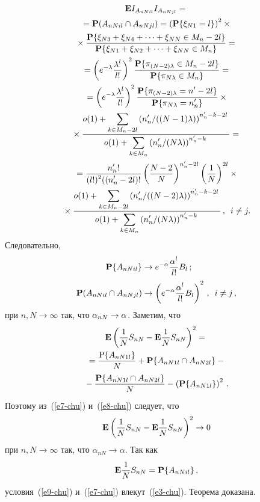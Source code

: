 \begin{multicols}{2}
\noindent
\begin{multline*}
\mathbf{E} I_{A_{nNil}}I_{A_{nNjl}}={}\\[1pt]
{}=\mathbf{P}(A_{nNil}\cap A_{nNjl}) =
\left(\mathbf{P}\{\xi_{N1}=l\}\right)^2\times{}\\[1pt]
{}\times \displaystyle\frac{\displaystyle \mathbf{P}\{
 \xi_{N3}+\xi_{N4}+ \dots +\xi_{NN}\in M_n-2l\}\mathstrut}{\displaystyle \mathbf{P}\{
 \xi_{N1}+\xi_{N2}+ \dots +\xi_{NN}\in M_n\}\mathstrut}={}\\[1pt]
{}=
\left(e^{-\lambda}\displaystyle\frac{\displaystyle \lambda^l\mathstrut}{\displaystyle l!\mathstrut}\right)^2\displaystyle\frac{\displaystyle \mathbf{P}\{
\pi_{(N-2)\lambda}\in M_n-2l\}\mathstrut}{\displaystyle \mathbf{P}\{\pi_{N\lambda}\in M_n\}\mathstrut} ={}\\[1pt]
{}=
\left(e^{-\lambda}\displaystyle\frac{\displaystyle \lambda^l\mathstrut}{\displaystyle l!\mathstrut}\right)^2\displaystyle\frac{\displaystyle \mathbf{P}\{
\pi_{(N-2)\lambda}=n'-2l\}\mathstrut}{\displaystyle \mathbf{P}\{\pi_{N\lambda}=n'_n\}\mathstrut}\times{}\\[1pt]
{}\times
\displaystyle\frac{\displaystyle o(1)+\sum\limits_{k\in M_n-2l}\left({n'_n}/{((N-1)\lambda)}\right)^{n'_n-k-2l}\mathstrut}{\displaystyle 
o(1)+\sum\limits_{k\in M_n}\left({n'_n}/{(N\lambda)}\right)^{n'_n-k}\mathstrut} ={}\\[1pt]
{}
=\displaystyle\frac{\displaystyle n'_n!\mathstrut}{\displaystyle (l!)^2((n'_n-2l)!\mathstrut}\left(\displaystyle\frac{\displaystyle N-2\mathstrut}{\displaystyle N\mathstrut}\right)^{n'_n-2l}\left(\displaystyle\frac{\displaystyle 1\mathstrut}{\displaystyle N\mathstrut}\right)^{2l}\times{}\\[1pt]
{}\times
\displaystyle\frac{\displaystyle o(1)+\sum\limits_{k\in M_n-2l}\left({n'_n}/{((N-2)\lambda)}\right)^{n'_n-k-2l}\mathstrut}{\displaystyle 
o(1)+\sum\limits_{k\in M_n}\left({n'_n}/{(N\lambda)}\right)^{n'_n-k}\mathstrut}\,,\enskip i\ne j.
\end{multline*}
Следовательно,
\begin{align}
\mathbf{P}\{A_{nNil}\} &\to e^{-\alpha}\fr{\alpha^l}{l!}B_l \,;
\label{e7-chu}\\
\mathbf{P}(A_{nNil}\cap
A_{nNjl})&\to\left(e^{-\alpha}\fr{\alpha^l}{l!}B_l\right)^2\,,\enskip i\ne j\,, 
\label{e8-chu}
\end{align}
при $n, N\to\infty$ так, что $\alpha_{nN}\hm\to\alpha$. Заметим, что
\begin{multline*}
\mathbf{E}\left(\displaystyle\frac{\displaystyle 1\mathstrut}{\displaystyle N\mathstrut}S_{nN}-\mathbf{E}\displaystyle\frac{\displaystyle 1\mathstrut}{\displaystyle N\mathstrut}S_{nN}\right)^2={}\\
{}=
\displaystyle\frac{\displaystyle \mathrm{P}\{A_{nN1l}\}\mathstrut}{\displaystyle N\mathstrut}+\mathbf{P}\{A_{nN1l}\cap A_{nN2l}\}-{}\\
{}-\displaystyle\frac{\displaystyle \mathbf{P}\{A_{nN1l}\cap
A_{nN2l}\}\mathstrut}{\displaystyle N\mathstrut}-\left(\mathbf{P}\{A_{nN1l}\}\right)^2\,.
\end{multline*}
Поэтому из~(\ref{e7-chu}) и~(\ref{e8-chu}) следует, что
\begin{equation}
\mathbf{E}\left(\fr{1}{N}S_{nN}-\mathbf{E}\fr{1}{N}S_{nN}\right)^2\to 0
\label{e9-chu}
\end{equation}
при $n, N\to\infty$ так, что $\alpha_{nN}\to\alpha$. Так как 
$$
\mathbf{E} \displaystyle\frac{\displaystyle 1\mathstrut}{\displaystyle N\mathstrut}S_{nN}=\mathbf{P}\{A_{nNil}\}\,,
$$
условия~(\ref{e9-chu}) и~(\ref{e7-chu}) влекут~(\ref{e3-chu}). 
Теорема доказана.


\end{multicols}
